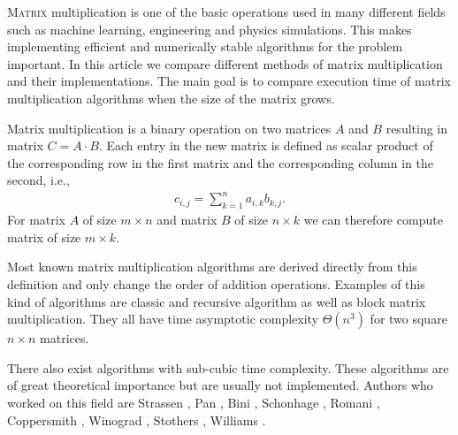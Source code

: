 \documentclass[a4paper,11pt]{article}
\begin{document}
\lettrine{M}{atrix} multiplication 
is one of the basic operations used in many different fields such 
as machine learning, engineering and physics simulations.
This makes implementing efficient and numerically stable algorithms for the problem important. 
In this article we compare different methods of matrix multiplication and their implementations. 
The main goal is to compare execution time of matrix multiplication algorithms when the size of the matrix grows.


Matrix multiplication is a binary operation on two matrices 
$A$ and $B$ resulting in matrix $C=A \cdot B$. Each entry in the new matrix is defined as scalar product of the corresponding row in the first matrix and the corresponding column in the second, i.e.,
\begin{align*}
c_{i,j} = \sum_{k=1}^{n} a_{i,k} b_{k,j}.
\end{align*}
For matrix $A$ of size $m \times n$ and matrix $B$ of size $n \times k$ we can therefore compute matrix %
of size $m \times k$.

Most known matrix multiplication algorithms are derived directly from this definition and only change the order of addition operations. 
Examples of this kind of algorithms are classic and recursive algorithm as well as block matrix multiplication.
They all have time asymptotic complexity $\Theta(n^3)$ for two square $n \times n$ matrices.

There also exist algorithms with sub-cubic time complexity. These algorithms are of great theoretical importance but are usually not implemented.
Authors who worked on this field are Strassen \cite{Strassen1969}, Pan \cite{Pan1978a}, Bini \cite{Bini1979}, Schonhage \cite{Schoenhage1971}, Romani \cite{Romani1982}, Coppersmith \cite{Coppersmith1982}, Winograd \cite{Coppersmith1982}, Stothers \cite{Davie2013}, Williams \cite{Williams}.
\end{document}
